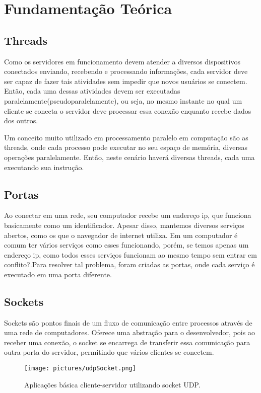 \documentclass[12pt]{article}
\begin{document}
\section{Fundamentação Teórica}

\subsection{Threads}

Como os servidores em funcionamento devem atender a diversos dispositivos conectados enviando, recebendo e processando informações, cada servidor deve ser capaz de fazer tais atividades sem impedir que novos usuários se conectem. Então, cada uma dessas atividades devem ser executadas paralelamente(pseudoparalelamente), ou seja, no mesmo instante no qual um cliente se conecta o servidor deve processar essa conexão enquanto recebe dados dos outros.

Um conceito muito utilizado em processamento paralelo em computação são as threads, onde cada processo pode executar no seu espaço de memória, diversas operações paralelamente. Então, neste cenário haverá diversas threads, cada uma executando sua instrução.

\subsection{Portas}

Ao conectar em uma rede, seu computador recebe um endereço ip, que funciona basicamente como um identificador. Apesar disso, mantemos diversos serviços abertos, como os que o navegador de internet utiliza. Em um computador é comum ter vários serviços como esses funcionando, porém, se temos apenas um endereço ip, como todos esses serviços funcionam ao mesmo tempo sem entrar em conflito?\cite{portas}.Para resolver tal problema, foram criadas as portas, onde cada serviço é executado em uma porta diferente.

\subsection{Sockets}

Sockets são pontos finais de um fluxo de comunicação entre processos através de uma rede de computadores. Oferece uma abstração para o desenvolvedor, pois ao receber uma conexão, o socket se encarrega de transferir essa comunicação para outra porta do servidor, permitindo que vários clientes se conectem.

\begin{figure}[!htb]
\centering
\texttt{[image: pictures/udpSocket.png]}
\caption{Aplicações básica cliente-servidor utilizando socket UDP.}
\label{exUdpSocket}
\end{figure}
\end{document}
